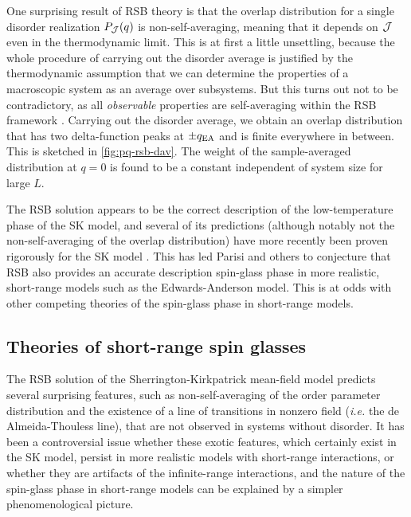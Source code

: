 One surprising result of RSB theory is that the overlap distribution for a
single disorder realization $P_{\mathcal{J}}(q)$ is non-self-averaging, meaning that it
depends on $\mathcal{J}$ even in the thermodynamic limit. This is at first a little
unsettling, because the whole procedure of carrying out the disorder average is
justified by the thermodynamic assumption that we can determine the properties
of a macroscopic system as an average over subsystems. But this turns out not
to be contradictory, as all \emph{observable} properties are self-averaging
within the RSB framework \autocite{stein2013spin}. Carrying out the disorder
average, we obtain an overlap distribution that has two delta-function peaks at
$\pm q_{\mathrm{EA}}$ and is finite everywhere in between. This is sketched in
\cref{fig:pq-rsb-dav}. The weight of the sample-averaged distribution at $q=0$
is found to be a constant independent of system size for large $L$.

The RSB solution appears to be the correct description of the low-temperature
phase of the SK model, and several of its predictions (although notably not the
non-self-averaging of the overlap distribution) have more recently been proven
rigorously for the SK model \autocite{talagrand2003spin}. This has led Parisi
and others to conjecture that RSB also provides an accurate description
spin-glass phase in more realistic, short-range models such as the
Edwards-Anderson model. This is at odds with other competing theories of the
spin-glass phase in short-range models.


\subsection{Theories of short-range spin glasses}
\label{sec:intro-theories}

The RSB solution of the Sherrington-Kirkpatrick mean-field model predicts
several surprising features, such as non-self-averaging of the order parameter
distribution and the existence of a line of transitions in nonzero field
(\textit{i.e.} the de Almeida-Thouless line), that are not observed in systems
without disorder. It has been a controversial issue whether these exotic
features, which certainly exist in the SK model, persist in more realistic
models with short-range interactions, or whether they are artifacts of the
infinite-range interactions, and the nature of the spin-glass phase in
short-range models can be explained by a simpler phenomenological picture.

